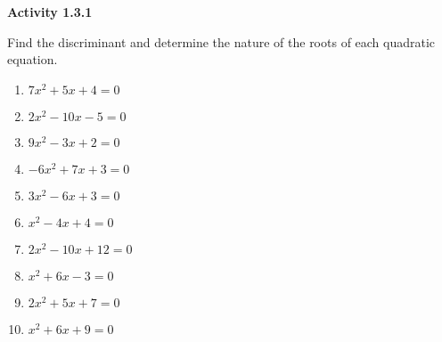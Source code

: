 \noindent\textbf{Activity 1.3.1}


Find the discriminant and determine the nature of the roots of each quadratic equation. 

\begin{multicols}{3}
\begin{enumerate}[label = \color{blue}\arabic*. ]
   \item $ 7x^2 + 5x + 4 = 0 $
   \item $ 2x^2 - 10x - 5 = 0 $
   \item $ 9x^2 - 3x + 2 = 0 $
   \item $ -6x^2 + 7x + 3 = 0 $
   \item $ 3x^2 - 6x + 3 = 0 $
   \item $ x^2 - 4x + 4 = 0 $
   \item $ 2x^2 - 10x + 12 = 0 $
   \item $ x^2 + 6x - 3 = 0 $
   \item $ 2x^2 + 5x + 7 = 0 $
  \item $ x^2 + 6x + 9 = 0 $
\end{enumerate}
\end{multicols} 